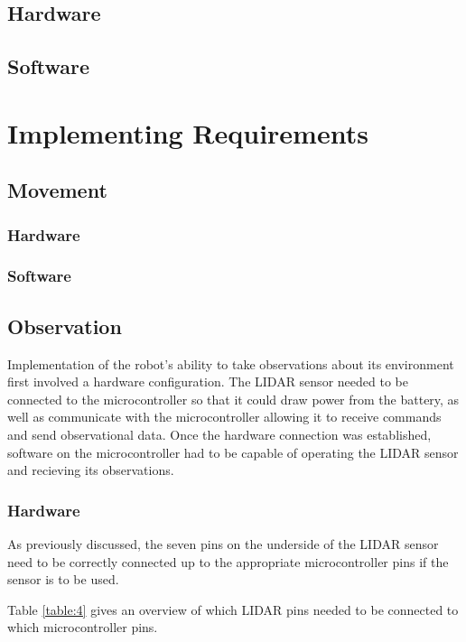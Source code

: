 			\subsection{Hardware}
			\subsection{Software}
		\section{Implementing Requirements}
			\subsection{Movement}
				\subsubsection{Hardware}
				\subsubsection{Software}
			\subsection{Observation}
			Implementation of the robot's ability to take observations about its environment first involved a hardware configuration. The LIDAR sensor needed to be connected to the microcontroller so that it could draw power from the battery, as well as communicate with the microcontroller allowing it to receive commands and send observational data. Once the hardware connection was established, software on the microcontroller had to be capable of operating the LIDAR sensor and recieving its observations.
				\subsubsection{Hardware}
				As previously discussed, the seven pins on the underside of the LIDAR sensor need to be correctly connected up to the appropriate microcontroller pins if the sensor is to be used.
				
				Table \ref{table:4} gives an overview of which LIDAR pins needed to be connected to which microcontroller pins.
				
